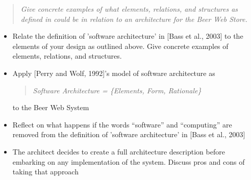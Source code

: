\begin{quote}
\emph{Give concrete examples of what elements, relations, and structures as defined in
\cite{bass2003sa} could be in relation to an architecture for the Beer Web Store.}
\end{quote}

\begin{itemize}
    \item Relate the definition of 'software architecture' in [Bass et
    al., 2003] to the elements of your design as outlined above. Give
    concrete examples of elements, relations, and structures.
    \item Apply [Perry and Wolf, 1992]'s model of software architecture as
      \begin{quote}
	{\it Software Architecture = \{Elements, Form, Rationale\}}
      \end{quote}
      to the Beer Web System
    \item Reflect on what happens if the words ``software'' and
    ``computing'' are removed from the definition of 'software
    architecture' in [Bass et al., 2003]
    \item The architect decides to create a full architecture
    description before embarking on any implementation of the
    system. Discuss pros and cons of taking that approach
\end{itemize}
